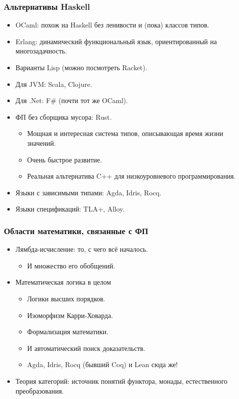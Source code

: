 \documentclass[11pt]{beamer}
\begin{document}
\begin{frame}[fragile]
  \frametitle{Альтернативы Haskell}
  \begin{itemize}
    \item OCaml: похож на Haskell без ленивости и (пока) классов типов.
    \item Erlang: динамический функциональный язык, ориентированный на многозадачность.
    \item Варианты Lisp (можно посмотреть Racket).
          \pause
    \item Для JVM: Scala, Clojure.
    \item Для .Net: F\# (почти тот же OCaml).
          \pause
    \item ФП без сборщика мусора: Rust.
          \begin{itemize}
            \item Мощная и интересная система типов, описывающая время жизни значений.
            \item Очень быстрое развитие.
            \item Реальная альтернатива C++ для низкоуровневого программирования.
          \end{itemize}
          \pause
    \item Языки с зависимыми типами: Agda, Idris, Rocq.
          \pause
    \item Языки спецификаций: TLA+, Alloy.
  \end{itemize}
\end{frame}

\begin{frame}[fragile]
  \frametitle{Области математики, связанные с ФП}
  \begin{itemize}
    \item Лямбда-исчисление: то, с чего всё началось.
          \begin{itemize}
            \item И множество его обобщений.
          \end{itemize}
          \pause
    \item Математическая логика в целом
          \begin{itemize}
            \item Логики высших порядков.
            \item Изоморфизм Карри-Ховарда.
            \item Формализация математики.
            \item И автоматический поиск доказательств.
            \item Agda, Idris, Rocq (бывший Coq) и Lean сюда же!
          \end{itemize}
          \pause
    \item Теория категорий: источник понятий функтора, монады, естественного преобразования.
  \end{itemize}
\end{frame}
\end{document}
